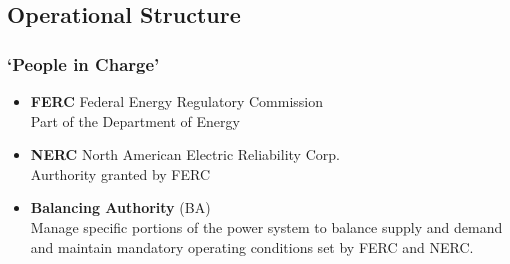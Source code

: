 \documentclass[14pt, unknownkeysallowed]{beamer}
\begin{document}
\subsection{Operational Structure}
\begin{frame}
\frametitle{`People in Charge'}
\begin{itemize}
\item \textbf{FERC}{ \footnotesize Federal Energy Regulatory Commission}\\
 Part of the Department of Energy
\item \textbf{NERC}{ \footnotesize
 North American Electric Reliability Corp.}\\
 Aurthority granted by FERC
 \item \textbf{Balancing Authority} (BA) \\
 Manage specific portions of the power system to balance supply and demand and maintain mandatory operating conditions set by FERC and NERC. %
\end{itemize}
\end{frame}
\end{document}
